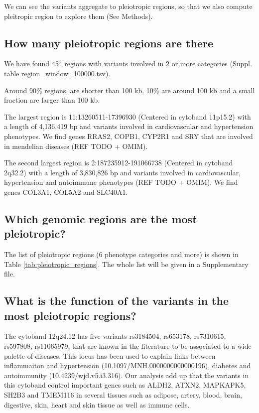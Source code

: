 We can see the variants aggregate to pleiotropic regions, so that we also compute pleitropic region to explore them (See Methods).

\subsection*{How many pleiotropic regions are there}

We have found 454 regions with variants involved in 2 or more categories (Suppl. table region_window_100000.tsv).

Around 90\% regions, are shorter than 100 kb, 10\% are around 100 kb and a small fraction are larger than 100 kb.

The largest region is 11:13260511-17396930 (Centered in cytoband 11p15.2) with a length of 4,136,419 bp and variants involved in cardiovascular and hypertension phenotypes.
We find genes RRAS2, COPB1, CYP2R1 and SRY that are involved in mendelian diseases (REF TODO + OMIM).

The second largest region is 2:187235912-191066738 (Centered in cytoband 2q32.2) with a length of 3,830,826 bp and variants involved in cardiovascular, hypertension and autoimmune phenotypes (REF TODO + OMIM).
We find genes COL3A1, COL5A2 and SLC40A1.

\subsection*{Which genomic regions are the most pleiotropic?}

The list of pleiotropic regions (6 phenotype categories and more) is shown in Table \ref{tab:pleiotropic_regions}. The whole list will be given in a Supplementary file.

\subsection*{What is the function of the variants in the most pleiotropic regions?}

The cytoband 12q24.12 has five variants rs3184504, rs653178, rs7310615, rs597808, rs11065979, that are known in the literature to be associated to a wide palette of diseases.
This locus has been used to explain links between inflammaiton and hypertension (10.1097/MNH.0000000000000196), diabetes and autoimmunity (10.4239/wjd.v5.i3.316).
%
Our analysis add up that the variants in this cytoband control important genes such as ALDH2, ATXN2, MAPKAPK5, SH2B3 and TMEM116 in several tissues such as adipose, artery, blood, brain, digestive, skin, heart and skin tissue as well as immune cells.

